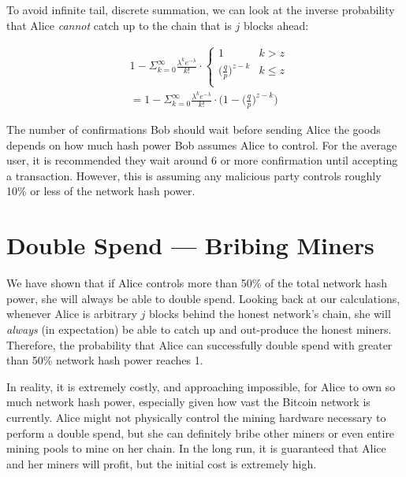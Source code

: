\documentclass[full.tex]{subfiles}
\begin{document}
    To avoid infinite tail, discrete summation, we can look at the inverse probability that Alice \textit{cannot} catch up to the chain that is $j$ blocks ahead:
    
    \begin{equation*}
        \begin{split}
           & 1 - \Sigma_{k=0}^\infty \frac{\lambda^k e^{-\lambda}}{k!} \cdot  \left\{
    \begin{array}{ll}
      1  & k > z \\ 
      \big(\frac{q}{p}\big)^{z-k} & k \leq z \\
    \end{array}
  \right. \\
  &= 1 -\Sigma_{k=0}^\infty \frac{\lambda^k e^{-\lambda}}{k!} \cdot \Bigg(1- \big(\frac{q}{p}\big)^{z-k}\Bigg)
        \end{split}
    \end{equation*}
    
    The number of confirmations Bob should wait before sending Alice the goods depends on how much hash power Bob assumes Alice to control. For the average user, it is recommended they wait around 6 or more confirmation until accepting a transaction. However, this is assuming any malicious party controls roughly 10\% or less of the network hash power. 
    
    \section*{Double Spend --- Bribing Miners}
    
    We have shown that if Alice controls more than 50\% of the total network hash power, she will always be able to double spend. Looking back at our calculations, whenever Alice is arbitrary $j$ blocks behind the honest network's chain, she will \textit{always} (in expectation) be able to catch up and out-produce the honest miners. Therefore, the probability that Alice can successfully double spend with greater than 50\% network hash power reaches 1.
    
    In reality, it is extremely costly, and approaching impossible, for Alice to own so much network hash power, especially given how vast the Bitcoin network is currently. Alice might not physically control the mining hardware necessary to perform a double spend, but she can definitely bribe other miners or even entire mining pools to mine on her chain. In the long run, it is guaranteed that Alice and her miners will profit, but the initial cost is extremely high.
    
\end{document}
